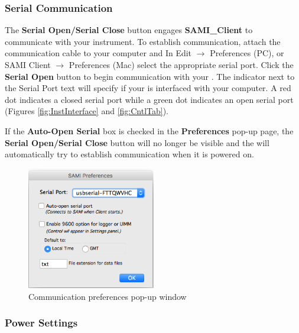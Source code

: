 \subsubsection{Serial Communication}
\label{Serial}

The \textbf{Serial Open/Serial Close} button engages \textbf{SAMI\_Client} to communicate with your instrument. To establish communication, attach the communication cable to your computer and \ifcase {}   \fi In Edit $\rightarrow$ Preferences (PC), or SAMI Client $\rightarrow$ Preferences (Mac) select the appropriate serial port. Click the \textbf{Serial Open} button to begin communication with your \instType{}. The indicator next to the Serial Port text will specify if your \instType{} is interfaced with your computer. A red dot indicates a closed serial port while a green dot indicates an open serial port (Figures \ref{fig:InstInterface} and \ref{fig:CntlTab}). 

If the \textbf{Auto-Open Serial } box is checked in the \textbf{Preferences} pop-up page, the \textbf{Serial Open/Serial Close} button will no longer be visible and the \instType{} will automatically try to establish communication when it is powered on.

\begin{figure}[ht]
\centering
\includegraphics[width=0.5\textwidth]{figs/Prefs.png}
\caption{Communication preferences pop-up window}
\label{fig:Prefs}
\end{figure}


\subsubsection{Power Settings}
\label{sec:SoftwarePower}

